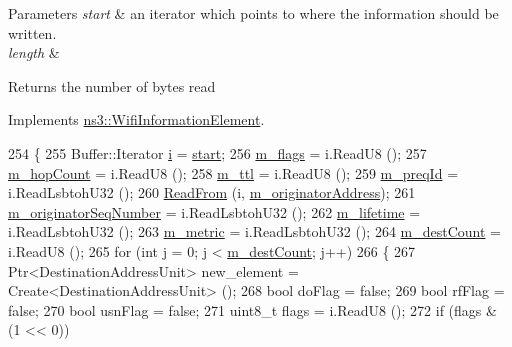 \begin{DoxyParams}{Parameters}
{\em start} & an iterator which points to where the information should be written. \\
\hline
{\em length} & \\
\hline
\end{DoxyParams}
\begin{DoxyReturn}{Returns}
the number of bytes read 
\end{DoxyReturn}


Implements \hyperlink{classns3_1_1WifiInformationElement_a92135cae0f188d7d8f6c30d9f4becd82}{ns3\+::\+Wifi\+Information\+Element}.


\begin{DoxyCode}
254 \{
255   Buffer::Iterator \hyperlink{bernuolliDistribution_8m_a6f6ccfcf58b31cb6412107d9d5281426}{i} = \hyperlink{namespacevisualizer_1_1core_a2a35e5d8a34af358b508dac8635754e0}{start};
256   \hyperlink{classns3_1_1dot11s_1_1IePreq_aa481740d69cb64893525bc6f0e46f222}{m\_flags} = i.ReadU8 ();
257   \hyperlink{classns3_1_1dot11s_1_1IePreq_a90d9d255882c0fb97aacc3e00975dea0}{m\_hopCount} = i.ReadU8 ();
258   \hyperlink{classns3_1_1dot11s_1_1IePreq_abb359cf45de091550c6b641ed0e44bd5}{m\_ttl} = i.ReadU8 ();
259   \hyperlink{classns3_1_1dot11s_1_1IePreq_a6c44925a70c9b23648530ad92919b976}{m\_preqId} = i.ReadLsbtohU32 ();
260   \hyperlink{namespacens3_aeeba9f1570f031f9e401f76f51943805}{ReadFrom} (i, \hyperlink{classns3_1_1dot11s_1_1IePreq_ad28b90801092d3c2accf79c2e6185624}{m\_originatorAddress});
261   \hyperlink{classns3_1_1dot11s_1_1IePreq_a06180eb291acfe73e88640ab62120fc1}{m\_originatorSeqNumber} = i.ReadLsbtohU32 ();
262   \hyperlink{classns3_1_1dot11s_1_1IePreq_afada94989172c28d2c6e2154833685b8}{m\_lifetime} = i.ReadLsbtohU32 ();
263   \hyperlink{classns3_1_1dot11s_1_1IePreq_ab4a0c5e3fc5fe2cd7c356d427899ff87}{m\_metric} = i.ReadLsbtohU32 ();
264   \hyperlink{classns3_1_1dot11s_1_1IePreq_a086a0d3448eca1d39ada3a2918f2e46e}{m\_destCount} = i.ReadU8 ();
265   \textcolor{keywordflow}{for} (\textcolor{keywordtype}{int} j = 0; j < \hyperlink{classns3_1_1dot11s_1_1IePreq_a086a0d3448eca1d39ada3a2918f2e46e}{m\_destCount}; j++)
266     \{
267       Ptr<DestinationAddressUnit> new\_element = Create<DestinationAddressUnit> ();
268       \textcolor{keywordtype}{bool} doFlag = \textcolor{keyword}{false};
269       \textcolor{keywordtype}{bool} rfFlag = \textcolor{keyword}{false};
270       \textcolor{keywordtype}{bool} usnFlag = \textcolor{keyword}{false};
271       uint8\_t flags = i.ReadU8 ();
272       \textcolor{keywordflow}{if} (flags & (1 << 0))

\end{DoxyCode}
